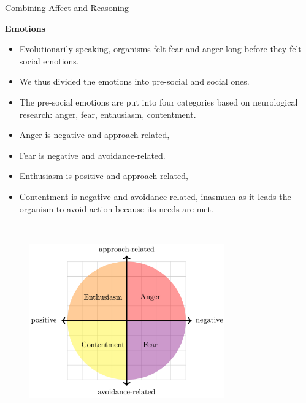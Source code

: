 \documentclass[final,hyperref={pdfpagelabels=false}]{beamer}
\begin{document}
\begin{frame}
\begin{columns}[t]
\begin{column}{.45\textwidth}
\begin{block}{Combining Affect and Reasoning}
                $~$
                
                \textbf{Emotions}
                \begin{itemize}
                	\item Evolutionarily speaking, organisms felt fear and anger long before they felt social emotions.
                	\item We thus divided the emotions into pre-social and social ones.
                	\item The pre-social emotions are put into four categories based on neurological research: anger, fear, enthusiasm, contentment.
                	\item Anger is negative and approach-related,
                	\item Fear is negative and avoidance-related.
                	\item Enthusiasm is positive and approach-related,
                	\item Contentment is negative and avoidance-related, inasmuch as it leads the organism to avoid action because its needs are met.
                \end{itemize}
                
                $~$
                
                \begin{figure}
                	\centering
                	\includegraphics[width=0.75\textwidth]{figures/psbc.png}
                \end{figure}
            \end{block}
        \end{column}
        

\end{columns}
\end{frame}
\end{document}
